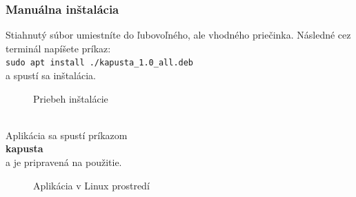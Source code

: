 \documentclass[a4paper, 11pt]{article}
\begin{document}
            \subsubsection{Manuálna inštalácia}
                Stiahnutý súbor umiestníte do ľubovoľného, ale vhodného priečinka. Následné cez terminál napíšete príkaz:\\
                \verb|sudo apt install ./kapusta_1.0_all.deb| \\
                a spustí sa inštalácia. 
                \begin{figure}[h]
                    \centering
                        \caption{Priebeh inštalácie}
                \end{figure}
                \\Aplikácia sa  spustí príkazom\\
                \textbf{kapusta} \\
                a je pripravená na použitie.
                \begin{figure}[h]
                    \centering
                        \caption{Aplikácia v Linux prostredí}
                \end{figure}
\end{document}
